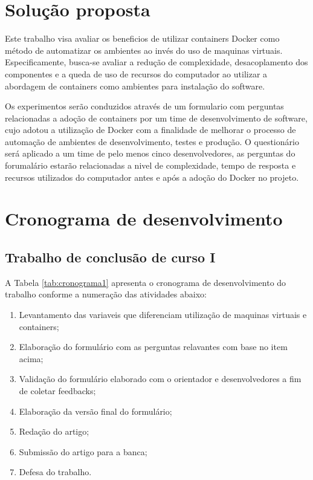 \documentclass[11pt,a4paper]{article}
\begin{document}
\section{Solução proposta}

Este trabalho visa avaliar os beneficios de utilizar containers Docker como método de automatizar os ambientes
ao invés do uso de maquinas virtuais. Especificamente, busca-se avaliar a redução de complexidade, desacoplamento dos
componentes e a queda de uso de recursos do computador ao utilizar a abordagem de containers como ambientes para instalação
do software.

Os experimentos serão conduzidos através de um formulario com perguntas relacionadas a adoção de containers por um time
de desenvolvimento de software, cujo adotou a utilização de Docker com a finalidade de melhorar o processo de automação
de ambientes de desenvolvimento, testes e produção. O questionário será aplicado a um time de pelo menos cinco desenvolvedores,
as perguntas do forumalário estarão relacionadas a nivel de complexidade, tempo de resposta e recursos utilizados do computador
antes e após a adoção do Docker no projeto.

\section{Cronograma de desenvolvimento}\label{sec:cronograma}

\subsection{Trabalho de conclusão de curso I}

A Tabela \ref{tab:cronograma1} apresenta o cronograma de desenvolvimento do trabalho conforme a numeração das atividades abaixo:
\begin{enumerate}
  \item Levantamento das variaveis que diferenciam utilização de maquinas virtuais e containers;
  \item Elaboração do formulário com as perguntas relavantes com base no item acima;
  \item Validação do formulário elaborado com o orientador e desenvolvedores a fim de coletar feedbacks;
  \item Elaboração da versão final do formulário;
  \item Redação do artigo;
  \item Submissão do artigo para a banca;
  \item Defesa do trabalho.
\end{enumerate}
\end{document}
